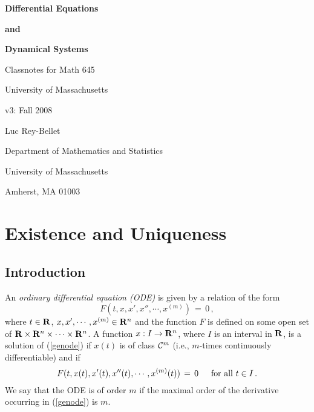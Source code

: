 \documentclass[12pt]{report}
\newcommand{\calC}{{\cal C}}
\newcommand{\bR}{{\bf R}}
\def\eqref#1{(\ref{#1})}
\def\to{\rightarrow}
\begin{document}
 

\thispagestyle{empty}

\begin{center}
{\bf \Large Differential Equations}
\end{center}
\begin{center}
{\bf \Large and}
\end{center}
\begin{center}
{\bf \Large Dynamical Systems}
\end{center}

\vspace{1cm}


\begin{center}
{\Large Classnotes for Math 645}
\end{center}
\begin{center}
{\Large University of Massachusetts}
\end{center}
\begin{center}
{\Large v3: Fall 2008}
\end{center}

\vspace{1cm}
\begin{center}
{\Large Luc Rey-Bellet} 
\end{center}
\begin{center}
{\Large  Department of Mathematics and Statistics}
\end{center}
\begin{center}
{\Large  University of Massachusetts}
\end{center}
\begin{center} 
{\Large Amherst, MA 01003}
\end{center}

\tableofcontents




\chapter{Existence and Uniqueness}
\thispagestyle{empty}
\section{Introduction}
An {\em ordinary differential equation (ODE)} is given by a relation of the form 
\begin{equation}\label{genode}
F(t, x, x', x'', \cdots, x^{(m)}) \,=\, 0 \,,
\end{equation}
where $t \in \bR$, $x,x', \cdots, x^{(m)} \in \bR^n$ and the function $F$
is defined on some open set of $\bR \times \bR^n \times \cdots \times
\bR^n$.  A function $x : I \to \bR^n$, where $I$ is an interval in $\bR$, is a solution of
\eqref{genode} if $x(t)$ is of class $\calC^m$ (i.e., $m$-times
continuously differentiable) and if
\begin{equation}
F(t, x(t), x'(t), x''(t), \cdots, x^{(m)}(t)) \,=\, 0 \, \quad {\rm
~for~all~} t \in I \,.
\end{equation}
We say that the ODE is of order $m$ if the maximal order of
the derivative occurring in \eqref{genode} is $m$. 
\end{document}
